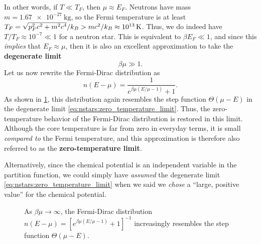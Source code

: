 In other words, if $T \ll T_F$, then $\mu \approx E_F$.
Neutrons have mass $m = \SI{1.67e-27}{\kilogram}$, so the Fermi temperature is at least $T_F = \sqrt{\smash[b]{p_F^2 c^2 + m^2 c^4}} / k_B > m c^2 / k_B \approx \SI{1e13}{\kelvin}$.
Thus, we do indeed have $T / T_F \approx 10^{-7} \ll 1$ for a neutron star.
This is equivalent to $\beta E_F \ll 1$, and since this \emph{implies} that $E_F \approx \mu$, then it is also an excellent approximation to take the \textbf{degenerate limit}
\begin{equation}
	\beta \mu \gg 1 .
\label{eq:nstars:zero_temperature_limit}
\end{equation}
Let us now rewrite the Fermi-Dirac distribution as
\begin{equation}
	n(E-\mu) = \frac{1}{e^{\beta \mu (E/\mu - 1)} + 1} .
\end{equation}
As shown in \cref{fig:nstars:distribution_convergence}, this distribution again resembles the step function $\Theta(\mu - E)$ in the degenerate limit \eqref{eq:nstars:zero_temperature_limit}.
Thus, the zero-temperature behavior of the Fermi-Dirac distribution is restored in this limit.
Although the core temperature is far from zero in everyday terms, it is small \emph{compared to} the Fermi temperature, and this approximation is therefore also referred to as the \textbf{zero-temperature limit}.

Alternatively, since the chemical potential is an independent variable in the partition function, we could simply have \emph{assumed} the degenerate limit \eqref{eq:nstars:zero_temperature_limit} when we said we \emph{chose} a ``large, positive value'' for the chemical potential.

\begin{figure}
	\centering
\caption{\label{fig:nstars:distribution_convergence}
	As $\beta \mu \rightarrow \infty$, the Fermi-Dirac distribution $n(E-\mu) = \left[ e^{\beta \mu \left( E / \mu - 1 \right)} + 1 \right]^{-1}$ increasingly resembles the step function $\Theta (\mu - E)$.
}
\end{figure}

